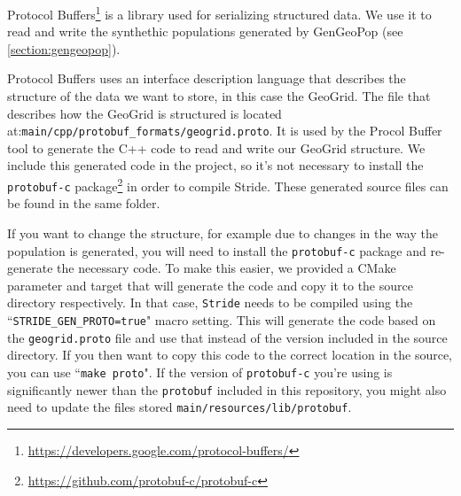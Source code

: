 Protocol Buffers\footnote{\url{https://developers.google.com/protocol-buffers/}} is a library used for serializing structured data. We use it to read and write the synthethic populations generated by GenGeoPop (see \ref{section:gengeopop}).

Protocol Buffers uses an interface description language that describes the structure of the data we want to store, in this case the GeoGrid. The file that describes how the GeoGrid is structured is located at:\texttt{main/cpp/protobuf\_formats/geogrid.proto}. It is used by the Procol Buffer tool to generate the C++ code to read and write our GeoGrid structure. We include this generated code in the project, so it's not necessary to install the \texttt{protobuf-c} package\footnote{\url{https://github.com/protobuf-c/protobuf-c}} in order to compile Stride. These generated source files can be found in the same folder.

If you want to change the structure, for example due to changes in the way the population is generated, you will need to install the \texttt{protobuf-c}  package and re-generate the necessary code. To make this easier, we provided a CMake parameter and target that will generate the code and copy it to the source directory respectively. In that case, \texttt{Stride} needs to be compiled using the ``\texttt{STRIDE\_GEN\_PROTO=true}" macro setting. This will generate the code based on the \texttt{geogrid.proto} file and use that instead of the version included in the source directory. If you then want to copy this code to the correct location in the source, you can use ``\texttt{make proto}". If the version of \texttt{protobuf-c} you're using is significantly newer than the \texttt{protobuf} included in this repository, you might also need to update the files stored \texttt{main/resources/lib/protobuf}.

